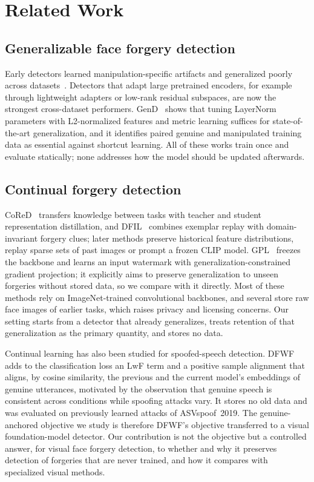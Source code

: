 \documentclass[journal]{IEEEtran}
\begin{document}
\section{Related Work}
\label{sec:related}

\subsection{Generalizable face forgery detection}
Early detectors learned manipulation-specific artifacts and generalized poorly across datasets~\cite{rossler2019faceforensics,yan2023deepfakebench}. Detectors that adapt large pretrained encoders, for example through lightweight adapters or low-rank residual subspaces, are now the strongest cross-dataset performers. GenD~\cite{yermakov2026gend} shows that tuning LayerNorm parameters with L2-normalized features and metric learning suffices for state-of-the-art generalization, and it identifies paired genuine and manipulated training data as essential against shortcut learning. All of these works train once and evaluate statically; none addresses how the model should be updated afterwards.

\subsection{Continual forgery detection}
CoReD~\cite{kim2021cored} transfers knowledge between tasks with teacher and student representation distillation, and DFIL~\cite{pan2023dfil} combines exemplar replay with domain-invariant forgery clues; later methods preserve historical feature distributions, replay sparse sets of past images or prompt a frozen CLIP model. GPL~\cite{zhang2025gpl} freezes the backbone and learns an input watermark with generalization-constrained gradient projection; it explicitly aims to preserve generalization to unseen forgeries without stored data, so we compare with it directly. Most of these methods rely on ImageNet-trained convolutional backbones, and several store raw face images of earlier tasks, which raises privacy and licensing concerns. Our setting starts from a detector that already generalizes, treats retention of that generalization as the primary quantity, and stores no data.

Continual learning has also been studied for spoofed-speech detection. DFWF~\cite{ma2021dfwf} adds to the classification loss an LwF term and a positive sample alignment that aligns, by cosine similarity, the previous and the current model's embeddings of genuine utterances, motivated by the observation that genuine speech is consistent across conditions while spoofing attacks vary. It stores no old data and was evaluated on previously learned attacks of ASVspoof~2019. The genuine-anchored objective we study is therefore DFWF's objective transferred to a visual foundation-model detector. Our contribution is not the objective but a controlled answer, for visual face forgery detection, to whether and why it preserves detection of forgeries that are never trained, and how it compares with specialized visual methods.
\end{document}
